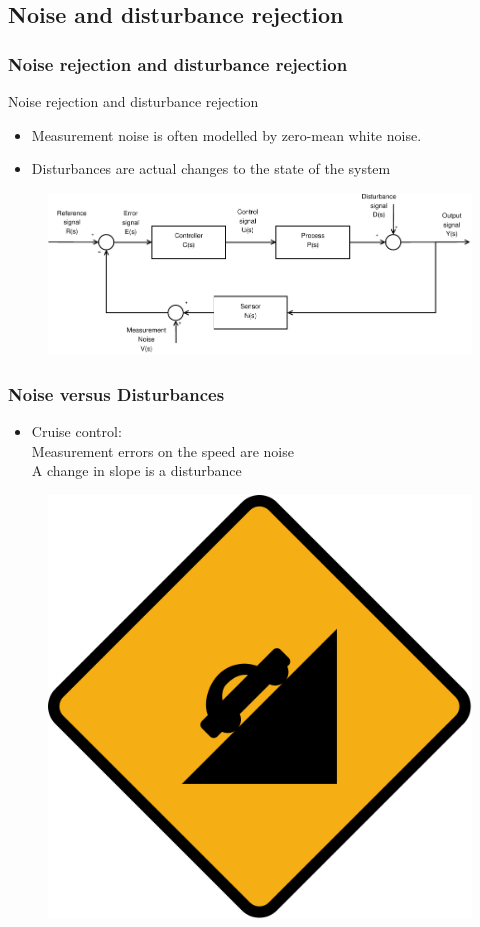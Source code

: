 \subsection[Noise and disturbance rejection]{Noise and disturbance rejection}

\begin{frame}
	\frametitle{Noise rejection and disturbance rejection}
	\begin{block}{Noise rejection and disturbance rejection}
		\begin{itemize}
			\item Measurement noise is often modelled by zero-mean white noise.
			\item Disturbances are actual changes to the state of the system
		\end{itemize}
		\vspace{-1em}
		\begin{figure}
		\centering
		\includegraphics[width=0.8\linewidth]{Closed-Loop-measure}
		\label{fig:Closed-Loop3}
		\end{figure}
	\end{block}
\end{frame}


\begin{frame}
	\frametitle{Noise versus Disturbances}
		\begin{itemize}
			\item Cruise control: \\
			Measurement errors on the speed are noise \\
			A change in slope is a disturbance
		\end{itemize}
		\begin{figure}
			\centering
			\includegraphics[width=0.45\linewidth]{control-goals/steep-road}
			\label{fig:cruisecontrol}
		\end{figure}
\end{frame}

